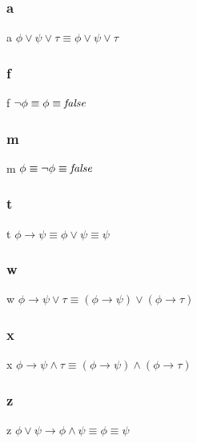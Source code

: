 \documentclass{article}
\begin{document}
\subsubsection{a}
\begin{logicenv}[5]{a}
    $\phi \lor \psi \lor \tau \equiv \phi \lor \psi \lor \tau$
\end{logicenv}

\subsubsection{f}
\begin{logicenv}[5]{f}
    $\neg \phi \equiv \phi \equiv \textrm{\textit{false}}$
\end{logicenv}

\subsubsection{m}
\begin{logicenv}[5]{m}
    $\phi \equiv \neg \phi \equiv \textrm{\textit{false}}$
\end{logicenv}

\subsubsection{t}
\begin{logicenv}[5]{t}
    $\phi \to \psi \equiv \phi \lor \psi \equiv \psi$
\end{logicenv}

\subsubsection{w}
\begin{logicenv}[5]{w}
    $\phi \to \psi \lor \tau \equiv (\phi \to \psi) \lor (\phi \to \tau)$
\end{logicenv}

\subsubsection{x}
\begin{logicenv}[5]{x}
    $\phi \to \psi \land \tau \equiv (\phi \to \psi) \land (\phi \to \tau)$
\end{logicenv}

\subsubsection{z}
\begin{logicenv}[5]{z}
    $\phi \lor \psi \to \phi \land \psi \equiv \phi \equiv \psi$
\end{logicenv}
\end{document}
